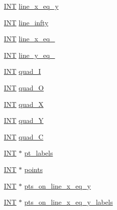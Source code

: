 \begin{DoxyCompactItemize}
\item 
\mbox{\hyperlink{galois_8h_a09fddde158a3a20bd2dcadb609de11dc}{I\+NT}} \mbox{\hyperlink{classpoint__line_a2e120880968e9b5aaee75671bb231b4c}{line\+\_\+x\+\_\+eq\+\_\+y}}
\item 
\mbox{\hyperlink{galois_8h_a09fddde158a3a20bd2dcadb609de11dc}{I\+NT}} \mbox{\hyperlink{classpoint__line_a006c12e8239fd9f9eb0366d201f77b77}{line\+\_\+infty}}
\item 
\mbox{\hyperlink{galois_8h_a09fddde158a3a20bd2dcadb609de11dc}{I\+NT}} \mbox{\hyperlink{classpoint__line_a29e46d3d5bb4e89f9cad66091befa42f}{line\+\_\+x\+\_\+eq\+\_}}
\item 
\mbox{\hyperlink{galois_8h_a09fddde158a3a20bd2dcadb609de11dc}{I\+NT}} \mbox{\hyperlink{classpoint__line_ad068c87120f27d94ec6b81aaf49619d0}{line\+\_\+y\+\_\+eq\+\_}}
\item 
\mbox{\hyperlink{galois_8h_a09fddde158a3a20bd2dcadb609de11dc}{I\+NT}} \mbox{\hyperlink{classpoint__line_a3a8bd353e12fceddb3052fd355c07dd9}{quad\+\_\+I}}
\item 
\mbox{\hyperlink{galois_8h_a09fddde158a3a20bd2dcadb609de11dc}{I\+NT}} \mbox{\hyperlink{classpoint__line_a7f1507beaadb38e84e410d21c3155b71}{quad\+\_\+O}}
\item 
\mbox{\hyperlink{galois_8h_a09fddde158a3a20bd2dcadb609de11dc}{I\+NT}} \mbox{\hyperlink{classpoint__line_a944d382ae5b600be7d9e50f2f61fdf92}{quad\+\_\+X}}
\item 
\mbox{\hyperlink{galois_8h_a09fddde158a3a20bd2dcadb609de11dc}{I\+NT}} \mbox{\hyperlink{classpoint__line_af9dd8d5d79e08b689aad694edfb96398}{quad\+\_\+Y}}
\item 
\mbox{\hyperlink{galois_8h_a09fddde158a3a20bd2dcadb609de11dc}{I\+NT}} \mbox{\hyperlink{classpoint__line_a2dbf133a15dbee0e1d38f03ba37ec8f5}{quad\+\_\+C}}
\item 
\mbox{\hyperlink{galois_8h_a09fddde158a3a20bd2dcadb609de11dc}{I\+NT}} $\ast$ \mbox{\hyperlink{classpoint__line_a4ab48082e0e0cfdb4516cbfdd815ab58}{pt\+\_\+labels}}
\item 
\mbox{\hyperlink{galois_8h_a09fddde158a3a20bd2dcadb609de11dc}{I\+NT}} $\ast$ \mbox{\hyperlink{classpoint__line_aa0de8aceb499f12c48180ac84e914656}{points}}
\item 
\mbox{\hyperlink{galois_8h_a09fddde158a3a20bd2dcadb609de11dc}{I\+NT}} $\ast$ \mbox{\hyperlink{classpoint__line_aa6f9c960d1e63457d3179230e5f368bd}{pts\+\_\+on\+\_\+line\+\_\+x\+\_\+eq\+\_\+y}}
\item 
\mbox{\hyperlink{galois_8h_a09fddde158a3a20bd2dcadb609de11dc}{I\+NT}} $\ast$ \mbox{\hyperlink{classpoint__line_a81473afa4f0e4e95b231c0fc02425d31}{pts\+\_\+on\+\_\+line\+\_\+x\+\_\+eq\+\_\+y\+\_\+labels}}

\end{DoxyCompactItemize}
